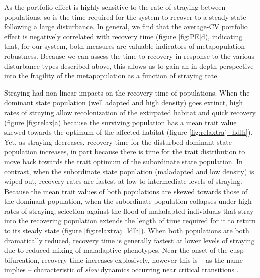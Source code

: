 \documentclass{revtex4}
\begin{document}
As the portfolio effect is highly sensitive to the rate of straying between populations, so is the time required for the system to recover to a steady state following a large disturbance.
In general, we find that the average-CV portfolio effect is negatively correlated with recovery time (figure \ref{fig:PE}d), indicating that, for our system, both measures are valuable indicators of metapopulation robustness.
Because we can assess the time to recovery in response to the various disturbance types described above, this allows us to gain an in-depth perspective into the fragility of the metapopulation as a function of straying rate.


Straying had non-linear impacts on the recovery time of populations. 
When the dominant state population (well adapted and high density) goes extinct, high rates of straying allow recolonization of the extirpated habitat and quick recovery (figure \ref{fig:relax}a) because the surviving population has a mean trait value skewed towards the optimum of the affected habitat (figure \ref{fig:relaxtraj_hdlh}).
Yet, as straying decreases, recovery time for the disturbed dominant state population increases, in part because there is time for the trait distribution to move back towards the trait optimum of the subordinate state population.
In contrast, when the subordinate state population (maladapted and low density) is wiped out, recovery rates are fastest at low to intermediate levels of straying.
Because the mean trait values of both populations are skewed towards those of the dominant population, when the subordinate population collapses under high rates of straying, selection against the flood of maladapted individuals that stray into the recovering population extends the length of time required for it to return to its steady state (figure \ref{fig:relaxtraj_ldlh}).
When both populations are both dramatically reduced, recovery time is generally fastest at lower levels of straying due to reduced mixing of maladaptive phenotypes.
Near the onset of the cusp bifurcation, recovery time increases explosively, however this is -- as the name implies -- characteristic of \emph{slow} dynamics occurring near critical transitions \citep{Scheffer:2009gg,Kuehn:2010p2591}.
\end{document}
